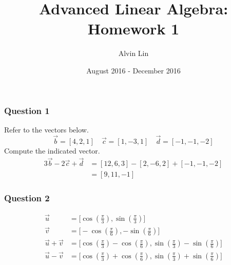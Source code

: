 \documentclass{math}
\title{Advanced Linear Algebra: Homework 1}
\author{Alvin Lin}
\date{August 2016 - December 2016}
\begin{document}
\maketitle

\subsubsection*{Question 1}
Refer to the vectors below.
\[ \vec{b} = [4,2,1] \quad \vec{c} = [1,-3,1] \quad \vec{d} = [-1,-1,-2] \]
Compute the indicated vector.
\begin{align*}
  3\vec{b}-2\vec{c}+\vec{d} &= [12,6,3]-[2,-6,2]+[-1,-1,-2] \\
  &= [9,11,-1]
\end{align*}

\subsubsection*{Question 2}
\begin{align*}
  \vec{u} &= \bigg[\cos(\frac{\pi}{3}),\sin(\frac{\pi}{3})\bigg] \\
  \vec{v} &= \bigg[-\cos(\frac{\pi}{6}),-\sin(\frac{\pi}{6})\bigg] \\
  \vec{u}+\vec{v} &= \bigg[\cos(\frac{\pi}{3})-\cos(\frac{\pi}{6}),
    \sin(\frac{\pi}{3})-\sin(\frac{\pi}{6})\bigg] \\
  \vec{u}-\vec{v} &= \bigg[\cos(\frac{\pi}{3})+\cos(\frac{\pi}{6}),
    \sin(\frac{\pi}{3})+\sin(\frac{\pi}{6})\bigg]
\end{align*}
\end{document}
